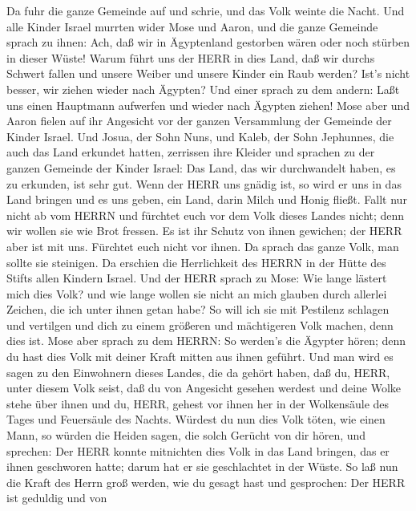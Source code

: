  Da fuhr die ganze Gemeinde auf und schrie, und das Volk
weinte die Nacht.  Und alle Kinder Israel murrten wider Mose
und Aaron, und die ganze Gemeinde sprach zu ihnen: Ach, daß wir in
Ägyptenland gestorben wären oder noch stürben in dieser Wüste!
 Warum führt uns der HERR in dies Land, daß wir durchs
Schwert fallen und unsere Weiber und unsere Kinder ein Raub werden?
Ist's nicht besser, wir ziehen wieder nach Ägypten?  Und
einer sprach zu dem andern: Laßt uns einen Hauptmann aufwerfen und
wieder nach Ägypten ziehen!  Mose aber und Aaron fielen auf
ihr Angesicht vor der ganzen Versammlung der Gemeinde der Kinder Israel.
 Und Josua, der Sohn Nuns, und Kaleb, der Sohn Jephunnes,
die auch das Land erkundet hatten, zerrissen ihre Kleider 
und sprachen zu der ganzen Gemeinde der Kinder Israel: Das Land, das wir
durchwandelt haben, es zu erkunden, ist sehr gut.  Wenn der
HERR uns gnädig ist, so wird er uns in das Land bringen und es uns
geben, ein Land, darin Milch und Honig fließt.  Fallt nur
nicht ab vom HERRN und fürchtet euch vor dem Volk dieses Landes nicht;
denn wir wollen sie wie Brot fressen. Es ist ihr Schutz von ihnen
gewichen; der HERR aber ist mit uns. Fürchtet euch nicht vor ihnen.
 Da sprach das ganze Volk, man sollte sie steinigen. Da
erschien die Herrlichkeit des HERRN in der Hütte des Stifts allen
Kindern Israel.  Und der HERR sprach zu Mose: Wie lange
lästert mich dies Volk? und wie lange wollen sie nicht an mich glauben
durch allerlei Zeichen, die ich unter ihnen getan habe?  So
will ich sie mit Pestilenz schlagen und vertilgen und dich zu einem
größeren und mächtigeren Volk machen, denn dies ist.  Mose
aber sprach zu dem HERRN: So werden's die Ägypter hören; denn du hast
dies Volk mit deiner Kraft mitten aus ihnen geführt.  Und
man wird es sagen zu den Einwohnern dieses Landes, die da gehört haben,
daß du, HERR, unter diesem Volk seist, daß du von Angesicht gesehen
werdest und deine Wolke stehe über ihnen und du, HERR, gehest vor ihnen
her in der Wolkensäule des Tages und Feuersäule des Nachts.
 Würdest du nun dies Volk töten, wie einen Mann, so würden
die Heiden sagen, die solch Gerücht von dir hören, und sprechen:
 Der HERR konnte mitnichten dies Volk in das Land bringen,
das er ihnen geschworen hatte; darum hat er sie geschlachtet in der
Wüste.  So laß nun die Kraft des Herrn groß werden, wie du
gesagt hast und gesprochen:  Der HERR ist geduldig und von
